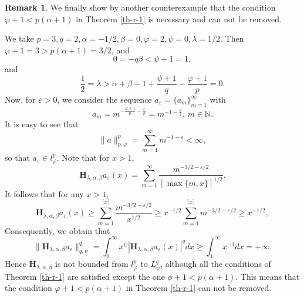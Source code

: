 \documentclass[10pt]{amsart}
\theoremstyle{definition}    %
\newtheorem{remark}[theorem]{Remark}
\numberwithin{equation}{section}
\begin{document}
\begin{remark}
We finally show by another counterexample that the condition 
\(\varphi+1 < p(\alpha+1)\) in Theorem \ref{th-r-1} is necessary and can not be removed.  

We take $p=3, q=2, \alpha=-1/2,\beta=0,\varphi=2, \psi=0,\lambda=1/2$. Then 
$\varphi+1=3>p(\alpha+1)=3/2$, and  
\[
0=-q\beta<\psi+1=1,
\]
and
\[
\frac{1}{2}=\lambda>\alpha+\beta+1+\frac{\psi+1}{q}-\frac{\varphi+1}{p}=0.
\]
Now, for \(\varepsilon>0\), we consider the sequence $a_{\varepsilon}=\{a_m\}_{m=1}^{\infty}$ with 
\[a_m = m^{-\frac{\varphi+1}{p}-\frac{\varepsilon}{p}} = m^{-1-\frac{\varepsilon}{2}},\, m\in \mathbb{N}.\]
It is easy to see that
\[
\|a\|_{p,\varphi}^p=\sum_{m=1}^\infty m^{-1-\varepsilon}< \infty,
\]
so that \(a_{\varepsilon} \in l_\varphi^p\). Note that for \(x>1\),
\[
\mathbf{H}_{\lambda,\alpha,\beta}a_{\varepsilon}(x)=\sum_{m=1}^\infty \frac{m^{-3/2-\varepsilon/2}}{[\max\{m,x\}]^{1/2}}.
\]
It follows that for any $x>1$,
\[
\mathbf{H}_{\lambda,\alpha,\beta}a_{\varepsilon}(x)\geq\sum_{m=1}^{\lceil x \rceil}\frac{m^{-3/2-\varepsilon/2}}{x^{1/2}}\geq x^{-1/2}\sum_{m=1}^{\lceil x \rceil}m^{-3/2-\varepsilon/2}\geq x^{-1/2},
\]
Consequently, we obtain that 
\[
\|\mathbf{H}_{\lambda,\alpha,\beta}a_{\varepsilon}\|_{q,\psi}^q=\int_0^\infty x^\psi |\mathbf{H}_{\lambda,\alpha,\beta}a_{\varepsilon}(x)|^q dx
\geq \int_1^\infty x^{-1} dx=+\infty.
\]
Hence $\mathbf{H}_{\lambda,\alpha,\beta}$ is not bounded from \(l_\varphi^p\) to \(L_\psi^q\), although all the conditions of Theorem \ref{th-r-1} are satisfied except the one \(\phi+1 < p(\alpha+1)\). This means that 
the condition \(\varphi+1 < p(\alpha+1)\) in Theorem \ref{th-r-1} can not be removed. 
\end{remark}
\end{document}
